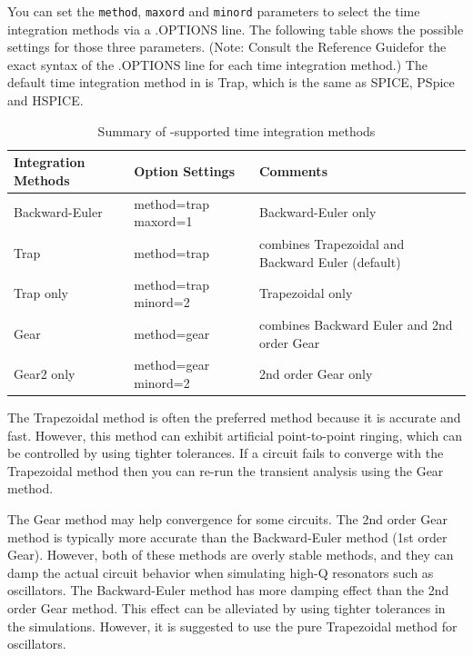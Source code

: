 You can set the \verb|method|, \verb|maxord| and \verb|minord| parameters to select the time
integration methods via a .OPTIONS line. The following table shows the possible settings for those
three parameters. (Note: Consult the \Xyce{} Reference Guide\ReferenceGuide for the exact syntax of the .OPTIONS
line for each time integration method.) The default time integration method in \Xyce{} is Trap, which 
is the same as SPICE, PSpice and HSPICE.

\begin{table}[htbp]
  \caption{Summary of \Xyce{}-supported time integration methods \label{Time_integration}}
  \begin{tabularx}{\linewidth}{|Y|Y|Y|}
     \color{white}\bf  Integration Methods &
    \color{white}\bf  Option Settings & \color{white}\bf Comments \\ \hline
    Backward-Euler & method=trap maxord=1 & Backward-Euler only \\ \hline
    Trap & method=trap & combines Trapezoidal and Backward Euler (default) \\ \hline
    Trap only & method=trap minord=2 & Trapezoidal only \\ \hline
    Gear &  method=gear &  combines Backward Euler and 2nd order Gear \\ \hline
    Gear2 only &  method=gear minord=2 & 2nd order Gear only  \\ \hline
  \end{tabularx}
  
\end{table}



The Trapezoidal method is often the preferred method because it is accurate and fast.
However, this method can exhibit artificial point-to-point ringing, which can be
controlled by using tighter tolerances. If a circuit fails to converge with the
Trapezoidal method then you can re-run the transient analysis using the Gear method. 

The Gear method may help convergence for some circuits. The 2nd order Gear method is 
typically more accurate than the Backward-Euler method (1st order Gear). However, 
both of these methods are overly stable methods, and they 
can damp the actual circuit behavior when simulating high-Q resonators such as oscillators. 
The Backward-Euler method has more damping effect than the 2nd order Gear method. 
This effect can be alleviated by using tighter tolerances in the simulations. However, it is 
suggested to use the pure Trapezoidal method for oscillators.


